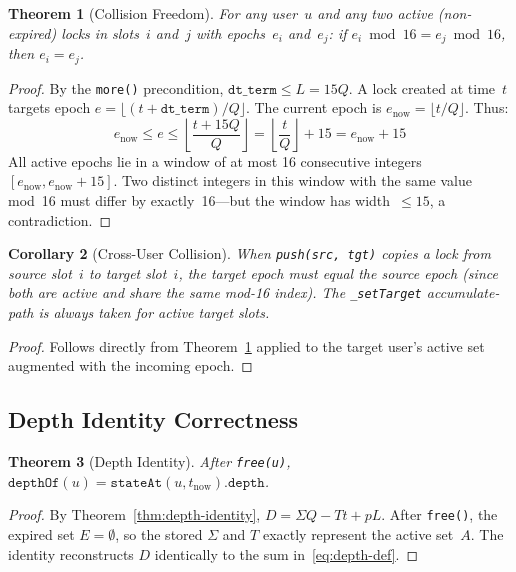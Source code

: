 \documentclass[10pt,a4paper,twocolumn]{article}
\theoremstyle{definition}
\theoremstyle{plain}
\newtheorem{theorem}{Theorem}[section]
\newtheorem{corollary}[theorem]{Corollary}
\theoremstyle{remark}
\begin{document}
\begin{theorem}[Collision Freedom]
\label{thm:collision}
For any user~$u$ and any two active (non-expired) locks in slots~$i$ and~$j$ with epochs~$e_i$ and~$e_j$: if $e_i \bmod 16 = e_j \bmod 16$, then $e_i = e_j$.
\end{theorem}

\begin{proof}
By the \texttt{more()} precondition, $\texttt{dt\_term} \leq L = 15Q$. A lock created at time~$t$ targets epoch $e = \lfloor(t{+}\texttt{dt\_term})/Q\rfloor$. The current epoch is $e_{\text{now}} = \lfloor t/Q \rfloor$. Thus:
\[
e_{\text{now}} \leq e \leq \left\lfloor \frac{t + 15Q}{Q} \right\rfloor = \left\lfloor \frac{t}{Q} \right\rfloor + 15 = e_{\text{now}} + 15
\]
All active epochs lie in a window of at most 16 consecutive integers $[e_{\text{now}}, e_{\text{now}}{+}15]$. Two distinct integers in this window with the same value mod~16 must differ by exactly~16---but the window has width~$\leq 15$, a contradiction.
\end{proof}

\begin{corollary}[Cross-User Collision]
\label{cor:cross-user}
When \texttt{push(src, tgt)} copies a lock from source slot~$i$ to target slot~$i$, the target epoch must equal the source epoch (since both are active and share the same mod-16 index). The \texttt{\_setTarget} accumulate-path is always taken for active target slots.
\end{corollary}

\begin{proof}
Follows directly from Theorem~\ref{thm:collision} applied to the target user's active set augmented with the incoming epoch.
\end{proof}

\subsection{Depth Identity Correctness}

\begin{theorem}[Depth Identity]
\label{thm:depth-correct}
After \texttt{free(u)}, $\texttt{depthOf}(u) = \texttt{stateAt}(u, t_{\text{now}}).\texttt{depth}$.
\end{theorem}

\begin{proof}
By Theorem~\ref{thm:depth-identity}, $D = \Sigma Q - Tt + pL$. After \texttt{free()}, the expired set $E = \emptyset$, so the stored $\Sigma$ and $T$ exactly represent the active set~$A$. The identity reconstructs $D$ identically to the sum in~\eqref{eq:depth-def}.
\end{proof}
\end{document}
